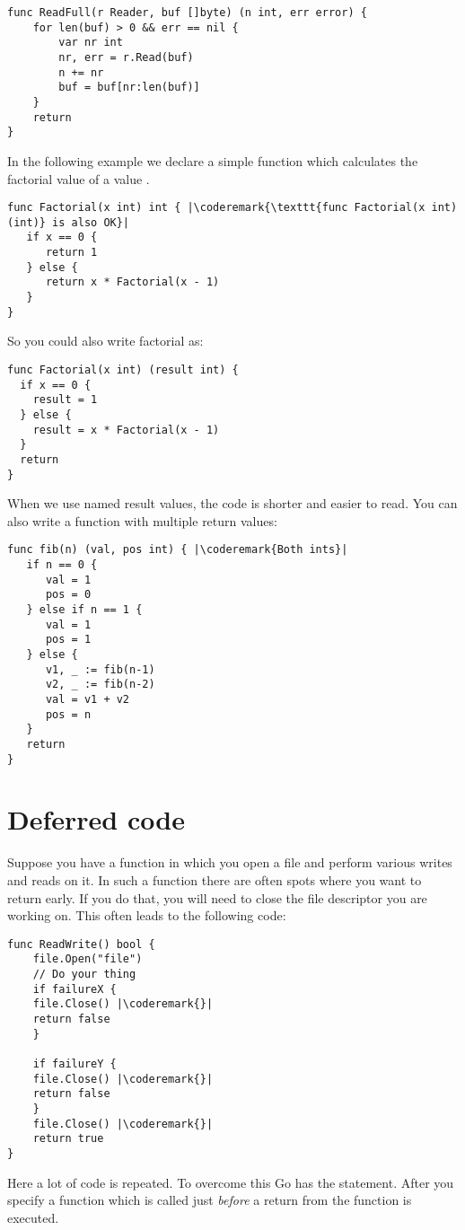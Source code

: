 \begin{lstlisting}
func ReadFull(r Reader, buf []byte) (n int, err error) {
    for len(buf) > 0 && err == nil {
        var nr int
        nr, err = r.Read(buf)
        n += nr
        buf = buf[nr:len(buf)]
    }
    return
}
\end{lstlisting}
In the following example we declare a simple function which calculates
the factorial value of a value .
\begin{lstlisting}
func Factorial(x int) int { |\coderemark{\texttt{func Factorial(x int) (int)} is also OK}|
   if x == 0 {
      return 1
   } else {
      return x * Factorial(x - 1)
   }
}
\end{lstlisting}
So you could also write factorial as:
\begin{lstlisting}
func Factorial(x int) (result int) {
  if x == 0 {
    result = 1	
  } else {
    result = x * Factorial(x - 1)
  }
  return
}
\end{lstlisting}
When we use named result values, the code is shorter and
easier to read.
You can also write a function with multiple return values:
\begin{lstlisting}
func fib(n) (val, pos int) { |\coderemark{Both ints}|
   if n == 0 {
      val = 1
      pos = 0
   } else if n == 1 {
      val = 1
      pos = 1
   } else {
      v1, _ := fib(n-1)
      v2, _ := fib(n-2)
      val = v1 + v2
      pos = n
   }
   return
}
\end{lstlisting}

\section{Deferred code}
\label{sec:deferred code}
Suppose you have a function in which you open a file and perform various
writes and reads on it. In such a function there are often spots where
you want to return early. If you do that, you will need to close the file
descriptor you are working on. This often leads to the following code:
\begin{lstlisting}[caption=Without defer]
func ReadWrite() bool {
    file.Open("file")
    // Do your thing
    if failureX {
	file.Close() |\coderemark{}|
	return false
    }

    if failureY {
	file.Close() |\coderemark{}|
	return false
    }
    file.Close() |\coderemark{}|
    return true
}
\end{lstlisting}
Here a lot of code is repeated. To overcome this Go has the
 statement. After
 you specify a function which is called just \emph{before} a
return from the function is executed.

